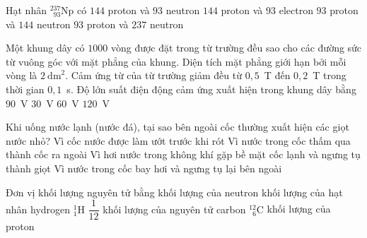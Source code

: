 \begin{ex}
\begin{minipage}[t]{0.3\linewidth}
		\end{minipage}
	\end{ex}

	\begin{ex}%
		Hạt nhân $^{237}_{\phantom{2}93}\text{Np}$ có
		\choice
		{$144$ proton và $93$ neutron}
		{$144$ proton và $93$ electron}
		{\True $93$ proton và $144$ neutron}
		{$93$ proton và $237$ neutron}
	\end{ex}

	\begin{ex}%
		Một khung dây có $1000$ vòng được đặt trong từ trường đều sao cho các đường sức từ vuông góc với mặt phẳng của khung. Diện tích mặt phẳng giới hạn bởi mỗi vòng là $2~\text{dm}^2$. Cảm ứng từ của từ trường giảm đều từ $0{,}5$~T đến $0{,}2$~T trong thời gian $0{,}1$~s. Độ lớn suất điện động cảm ứng xuất hiện trong khung dây bằng
		\choice
		{$90$~V}
		{$30$~V}
		{\True $60$~V}
		{$120$~V}
	\end{ex}

	\begin{ex}%
		Khi uống nước lạnh (nước đá), tại sao bên ngoài cốc thường xuất hiện các giọt nước nhỏ?
		\choice
		{Vì cốc nước được làm ướt trước khi rót}
		{Vì nước trong cốc thấm qua thành cốc ra ngoài}
		{\True Vì hơi nước trong không khí gặp bề mặt cốc lạnh và ngưng tụ thành giọt}
		{Vì nước trong cốc bay hơi và ngưng tụ lại bên ngoài}
	\end{ex}

	\begin{ex}%
		Đơn vị khối lượng nguyên tử bằng
		\choice
		{khối lượng của neutron}
		{khối lượng của hạt nhân hydrogen ${}^1_1\text{H}$}
		{\True $\dfrac{1}{12}$ khối lượng của nguyên tử carbon ${}^{12}_{\phantom{1}6}\text{C}$}
		{khối lượng của proton}
	\end{ex}

